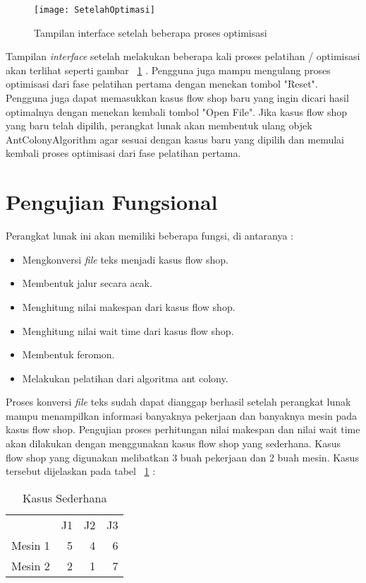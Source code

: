 \begin{figure}[H]
	\centering
	\texttt{[image: SetelahOptimasi]}
	\caption[Tampilan interface setelah beberapa proses optimisasi]{Tampilan interface setelah beberapa proses optimisasi}
	\label{fig:setelahoptimasi}
\end{figure}

Tampilan \textit{interface} setelah melakukan beberapa kali proses pelatihan / optimisasi akan terlihat
seperti gambar ~\ref{fig:setelahoptimasi} . Pengguna juga mampu mengulang proses optimisasi dari fase pelatihan pertama
dengan menekan tombol "Reset". Pengguna juga dapat memasukkan kasus flow shop baru
yang ingin dicari hasil optimalnya dengan menekan kembali tombol "Open File". Jika kasus flow shop yang baru telah dipilih, perangkat lunak akan membentuk ulang objek AntColonyAlgorithm
agar sesuai dengan kasus baru yang dipilih dan memulai kembali proses optimisasi dari fase pelatihan
pertama.

\section{Pengujian Fungsional}

Perangkat lunak ini akan memiliki beberapa fungsi, di antaranya : 
\begin{itemize}
	\item Mengkonversi \textit{file} teks menjadi kasus flow shop.
	\item Membentuk jalur secara acak.
	\item Menghitung nilai makespan dari kasus flow shop.
	\item Menghitung nilai wait time dari kasus flow shop.
	\item Membentuk feromon.
	\item Melakukan pelatihan dari algoritma ant colony.
\end{itemize}

Proses konversi \textit{file} teks sudah dapat dianggap berhasil setelah perangkat lunak mampu menampilkan
informasi banyaknya pekerjaan dan banyaknya mesin pada kasus flow shop.
Pengujian proses perhitungan nilai makespan dan nilai wait time akan dilakukan dengan menggunakan kasus flow 
shop yang sederhana. Kasus flow shop yang digunakan melibatkan 3 buah pekerjaan
dan 2 buah mesin. Kasus tersebut dijelaskan pada tabel ~\ref{tab:kasussederhana} :
\begin{table}[H]
	\centering
	\caption{Kasus Sederhana}
	\begin{tabular}{lrrr}
		& \multicolumn{1}{l}{J1} & \multicolumn{1}{l}{J2} & \multicolumn{1}{l}{J3} \\
		Mesin 1 & 5     & 4     & 6 \\
		Mesin 2 & 2     & 1     & 7 \\
	\end{tabular}%
	\label{tab:kasussederhana}%
\end{table}%

